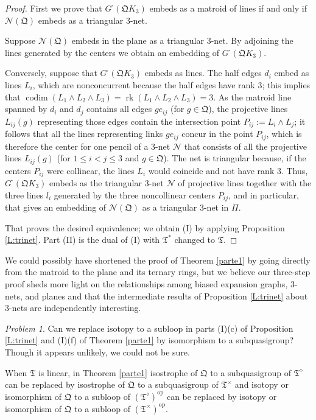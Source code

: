 \documentclass[reqno,12pt]{amsart}
\theoremstyle{remark}
\newtheorem{prob}[thm]{Problem}
\numberwithin{equation}{section}
\numberwithin{figure}{section}
\newcommand \rk{\operatorname{rk}}
\newcommand \codim{\operatorname{codim}}
\newcommand \full{^{{}^{{}_{{}_\bullet}}\!}}
\newcommand \opp{^\mathrm{op}}
\newcommand \cN{\mathcal{N}}
\newcommand \fQ{\mathfrak Q}
\newcommand \fT{\mathfrak T}
\newcommand\Qd{d}
\newcommand\PP{\Pi}	%
\newcommand\G{{G\full}}
\begin{document}
\begin{proof}
First we prove that $\G(\fQ K_3)$ embeds as a matroid of lines if and only if $\cN(\fQ)$ embeds as a triangular $3$-net.  

Suppose $\cN(\fQ)$ embeds in the plane as a triangular $3$-net.  By adjoining the lines generated by the centers we obtain an embedding of $\G(\fQ K_3)$.  

Conversely, suppose that $\G(\fQ K_3)$ embeds as lines.  The half edges $\Qd_i$ embed as lines $L_i$, which are nonconcurrent because the half edges have rank 3; this implies that $\codim(L_1\wedge L_2\wedge L_3) = \rk(L_1\wedge L_2\wedge L_3) = 3$.  As the matroid line spanned by $\Qd_i$ and $\Qd_j$ contains all edges $ge_{ij}$ (for $g\in\fQ$), the projective lines $L_{ij}(g)$ representing those edges contain the intersection point $P_{ij} := L_i \wedge L_j$; it follows that all the lines representing links $ge_{ij}$ concur in the point $P_{ij}$, which is therefore the center for one pencil of a $3$-net $\cN$ that consists of all the projective lines $L_{ij}(g)$ (for $1\leq i < j \leq 3$ and $g\in\fQ$).  The net is triangular because, if the centers $P_{ij}$ were collinear, the lines $L_i$ would coincide and not have rank 3.  
Thus, $\G(\fQ K_3)$ embeds as the triangular $3$-net $\cN$ of projective lines together with the three lines $l_i$ generated by the three noncollinear centers $P_{ij}$, and in particular, that gives an embedding of $\cN(\fQ)$ as a triangular $3$-net in $\PP$.

That proves the desired equivalence; we obtain (I) by applying Proposition \ref{L:trinet}.  Part (II) is the dual of (I) with $\fT^*$ changed to $\fT$.
\end{proof}

We could possibly have shortened the proof of Theorem \ref{parte1} by going directly from the matroid to the plane and its ternary rings, but we believe our three-step proof sheds more light on the relationships among biased expansion graphs, $3$-nets, and planes and that the intermediate results of Proposition \ref{L:trinet} about $3$-nets are independently interesting.

\begin{prob}\label{Pr:subqgp}
Can we replace isotopy to a subloop in parts (I)(c) of Proposition \ref{L:trinet} and (I)(f) of Theorem \ref{parte1} by isomorphism to a subquasigroup?  Though it appears unlikely, we could not be sure.
\end{prob}

When $\fT$ is linear, in Theorem \ref{parte1} isostrophe of $\fQ$ to a subquasigroup of $\fT^\diamond$ can be replaced by isostrophe of $\fQ$ to a subquasigroup of $\fT^\times$ and isotopy or isomorphism of $\fQ$ to a subloop of $(\fT^\diamond)\opp$ can be replaced by isotopy or isomorphism of $\fQ$ to a subloop of $(\fT^\times)\opp$.
\end{document}
